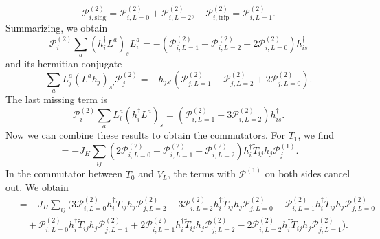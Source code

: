 \documentclass[11pt, a4paper]{article}
\begin{document}
\begin{equation}
\mathcal{P}_{i, \text{sing}}^{(2)} = \mathcal{P}_{i, L=0}^{(2)} + \mathcal{P}_{i, L=2}^{(2)}, \quad \mathcal{P}_{i, \text{trip}}^{(2)} = \mathcal{P}_{i, L=1}^{(2)}. \label{eq:A48}
\end{equation}
Summarizing, we obtain
\begin{equation}
\mathcal{P}_i^{(2)} \sum_a (h_i^{\dagger} L^a)_s L_i^a = -(\mathcal{P}_{i, L=1}^{(2)} - \mathcal{P}_{i, L=2}^{(2)} + 2\mathcal{P}_{i, L=0}^{(2)}) h_{is}^{\dagger} \label{eq:A49}
\end{equation}
and its hermitian conjugate
\begin{equation}
\sum_a L_j^a (L^a h_j)_{s'} \mathcal{P}_j^{(2)} = -h_{js'} (\mathcal{P}_{j, L=1}^{(2)} - \mathcal{P}_{j, L=2}^{(2)} + 2\mathcal{P}_{j, L=0}^{(2)}). \label{eq:A50}
\end{equation}
The last missing term is
\begin{equation}
\mathcal{P}_i^{(2)} \sum_a L_i^a (h_i^{\dagger} L^a)_s = (\mathcal{P}_{i, L=1}^{(2)} + 3\mathcal{P}_{i, L=2}^{(2)}) h_{is}^{\dagger}. \label{eq:A51}
\end{equation}
Now we can combine these results to obtain the commutators. For $T_1$, we find
\begin{equation}
[V_L, T_1] = -J_H \sum_{ij} (2\mathcal{P}_{i, L=0}^{(2)} + \mathcal{P}_{i, L=1}^{(2)} - \mathcal{P}_{i, L=2}^{(2)}) h_i^{\dagger} \tilde{T}_{ij} h_j \mathcal{P}_j^{(1)}. \label{eq:A54}
\end{equation}
In the commutator between $T_0$ and $V_L$, the terms with $\mathcal{P}^{(1)}$ on both sides cancel out. We obtain
\begin{align}
[V_L, T_0] &= -J_H \sum_{ij} (3\mathcal{P}_{i, L=0}^{(2)} h_i^{\dagger} \tilde{T}_{ij} h_j \mathcal{P}_{j, L=2}^{(2)} - 3\mathcal{P}_{i, L=2}^{(2)} h_i^{\dagger} \tilde{T}_{ij} h_j \mathcal{P}_{j, L=0}^{(2)} - \mathcal{P}_{i, L=1}^{(2)} h_i^{\dagger} \tilde{T}_{ij} h_j \mathcal{P}_{j, L=0}^{(2)} \nonumber \\
&\quad + \mathcal{P}_{i, L=0}^{(2)} h_i^{\dagger} \tilde{T}_{ij} h_j \mathcal{P}_{j, L=1}^{(2)} + 2\mathcal{P}_{i, L=1}^{(2)} h_i^{\dagger} \tilde{T}_{ij} h_j \mathcal{P}_{j, L=2}^{(2)} - 2\mathcal{P}_{i, L=2}^{(2)} h_i^{\dagger} \tilde{T}_{ij} h_j \mathcal{P}_{j, L=1}^{(2)}). \label{eq:A57}
\end{align}
\end{document}
